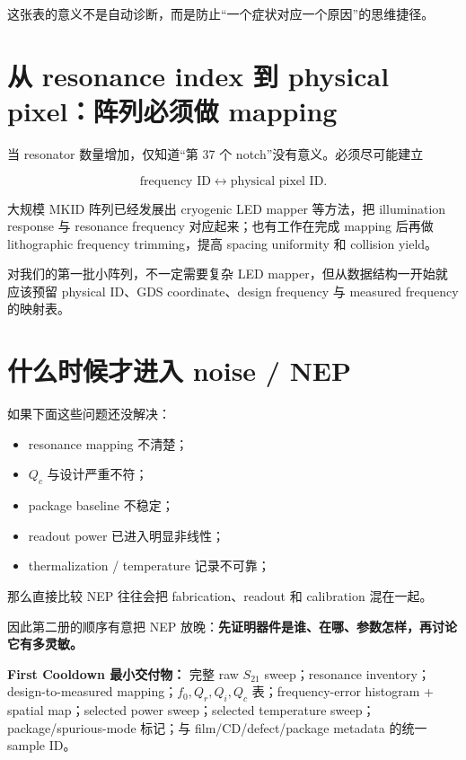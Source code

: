 这张表的意义不是自动诊断，而是防止“一个症状对应一个原因”的思维捷径。

\section{从 resonance index 到 physical pixel：阵列必须做 mapping}

当 resonator 数量增加，仅知道“第 37 个 notch”没有意义。必须尽可能建立

\[
\text{frequency ID} \leftrightarrow \text{physical pixel ID}.
\]

大规模 MKID 阵列已经发展出 cryogenic LED mapper 等方法，把 illumination response 与 resonance frequency 对应起来；也有工作在完成 mapping 后再做 lithographic frequency trimming，提高 spacing uniformity 和 collision yield。

对我们的第一批小阵列，不一定需要复杂 LED mapper，但从数据结构一开始就应该预留 physical ID、GDS coordinate、design frequency 与 measured frequency 的映射表。

\section{什么时候才进入 noise / NEP}

如果下面这些问题还没解决：

\begin{itemize}
  \item resonance mapping 不清楚；
  \item $Q_c$ 与设计严重不符；
  \item package baseline 不稳定；
  \item readout power 已进入明显非线性；
  \item thermalization / temperature 记录不可靠；
\end{itemize}

那么直接比较 NEP 往往会把 fabrication、readout 和 calibration 混在一起。

因此第二册的顺序有意把 NEP 放晚：\textbf{先证明器件是谁、在哪、参数怎样，再讨论它有多灵敏。}

\begin{measurebox}
\textbf{First Cooldown 最小交付物：}
完整 raw $S_{21}$ sweep；resonance inventory；design-to-measured mapping；$f_0,Q_r,Q_i,Q_c$ 表；frequency-error histogram + spatial map；selected power sweep；selected temperature sweep；package/spurious-mode 标记；与 film/CD/defect/package metadata 的统一 sample ID。
\end{measurebox}

